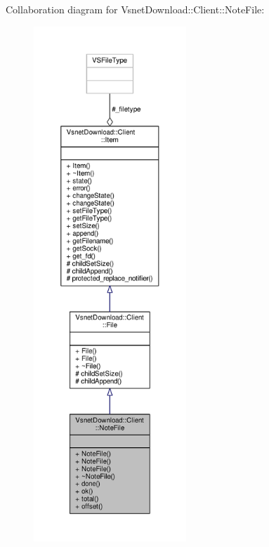 Collaboration diagram for Vsnet\+Download\+:\+:Client\+:\+:Note\+File\+:
\nopagebreak
\begin{figure}[H]
\begin{center}
\leavevmode
\includegraphics[height=550pt]{d8/d32/classVsnetDownload_1_1Client_1_1NoteFile__coll__graph}
\end{center}
\end{figure}
